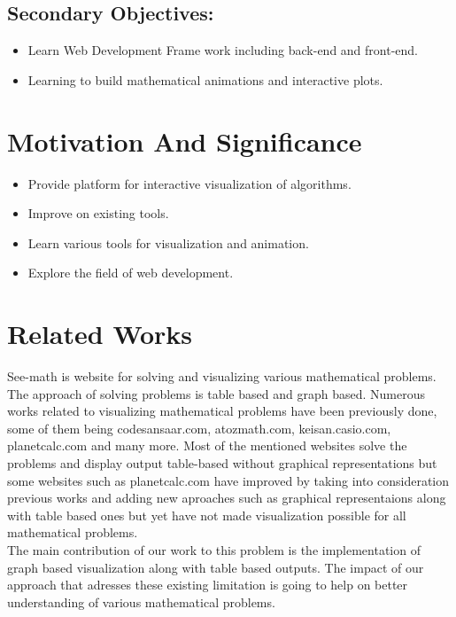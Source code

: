 \subsection{Secondary Objectives:}
\begin{itemize}
	\item Learn Web Development Frame work including back-end and front-end.
	\item Learning to build mathematical animations and interactive plots.
\end{itemize}
\section{\bf Motivation And Significance}
\begin{itemize}
	\item Provide platform for interactive visualization of algorithms.
	\item Improve on existing tools.
	\item Learn various tools for visualization and animation.
	\item Explore the field of web development.
\end{itemize}
\noindent

\section{{\bf{Related Works}}}
\noindent

See-math is website for solving and visualizing various mathematical problems. The approach of solving problems is table based and graph based. Numerous works related to visualizing mathematical problems have been previously done, some of them being codesansaar.com, atozmath.com, keisan.casio.com, planetcalc.com and many more. Most of the mentioned websites solve the problems and display output table-based without graphical representations but some websites such as planetcalc.com have improved by taking into consideration previous works and adding new aproaches such as graphical representaions along with table based ones but yet have not made visualization possible for all mathematical problems. \\

\noindent
The main contribution of our work to this problem is the implementation of graph based visualization along with table based outputs. The impact of our approach that adresses these existing limitation is going to help on better understanding of various mathematical problems.



